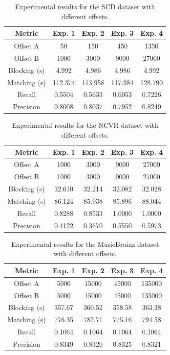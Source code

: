 \documentclass{ieeeaccess}
\begin{document}
\begin{table}[h]
\centering
\caption{Experimental results for the SCD dataset with different offsets.}
\label{tab:scd-results-transposed}
\begin{tabular}{c|cccc}
\hline
\textbf{Metric} & \textbf{Exp. 1} & \textbf{Exp. 2} & \textbf{Exp. 3} & \textbf{Exp. 4} \\
\hline
Offset A & 50 & 150 & 450 & 1350 \\
Offset B & 1000 & 3000 & 9000 & 27000 \\
Blocking (s) & 4.992 & 4.986 & 4.986 & 4.992 \\
Matching (s) & 112.374 & 113.958 & 117.984 & 128.790 \\
Recall & 0.5504 & 0.5633 & 0.6053 & 0.7226 \\
Precision & 0.8008 & 0.8037 & 0.7952 & 0.8249 \\
\hline
\end{tabular}
\end{table}

\begin{table}[h]
\centering
\caption{Experimental results for the NCVR dataset with different offsets.}
\label{tab:ncvr-results-transposed}
\begin{tabular}{c|cccc}
\hline
\textbf{Metric} & \textbf{Exp. 1} & \textbf{Exp. 2} & \textbf{Exp. 3} & \textbf{Exp. 4} \\
\hline
Offset A & 1000 & 3000 & 9000 & 27000 \\
Offset B & 1000 & 3000 & 9000 & 27000 \\
Blocking (s) & 32.610 & 32.214 & 32.082 & 32.028 \\
Matching (s) & 86.124 & 85.938 & 85.896 & 88.044 \\
Recall & 0.8288 & 0.8533 & 1.0000 & 1.0000 \\
Precision & 0.4122 & 0.3670 & 0.5550 & 0.5973 \\
\hline
\end{tabular}
\end{table}

\begin{table}[h]
\centering
\caption{Experimental results for the MusicBrainz dataset with different offsets.}
\label{tab:music-brainz-results-transposed}
\begin{tabular}{c|cccc}
\hline
\textbf{Metric} & \textbf{Exp. 1} & \textbf{Exp. 2} & \textbf{Exp. 3} & \textbf{Exp. 4} \\
\hline
Offset A & 5000 & 15000 & 45000 & 135000 \\
Offset B & 5000 & 15000 & 45000 & 135000 \\
Blocking (s) & 357.67 & 360.52 & 358.58 & 363.38 \\
Matching (s) & 776.35 & 782.71 & 775.16 & 794.58 \\
Recall & 0.1064 & 0.1064 & 0.1064 & 0.1064 \\
Precision & 0.8349 & 0.8320 & 0.8325 & 0.8321 \\
\hline
\end{tabular}
\end{table}
\end{document}
